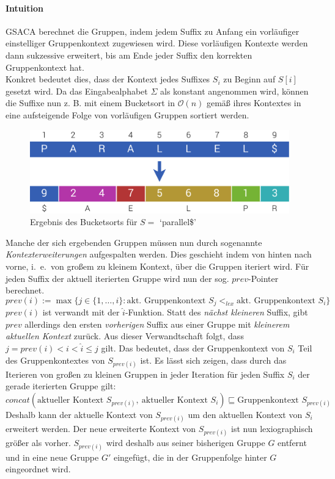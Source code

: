 \documentclass[twoside,a4paper,11pt]{article}
\theoremstyle{break}
\begin{document}
\paragraph{Intuition} GSACA berechnet die Gruppen, indem jedem Suffix zu Anfang ein vorläufiger einstelliger Gruppenkontext zugewiesen wird. Diese vorläufigen Kontexte werden dann sukzessive erweitert, bis am Ende jeder Suffix den korrekten Gruppenkontext hat.\\

Konkret bedeutet dies, dass der Kontext jedes Suffixes $S_i$ zu Beginn auf $S[i]$ gesetzt wird. Da das Eingabealphabet $\Sigma$ als konstant angenommen wird, können die Suffixe nun z. B. mit einem Bucketsort in $\mathcal{O}(n)$ gemäß ihres Kontextes in eine aufsteigende Folge von vorläufigen Gruppen sortiert werden.

\begin{figure}[h]
	\centering
	\includegraphics[width=0.5\linewidth,bb=0 0 640 207]{./assets/bucketsort.pdf}
	\caption{Ergebnis des Bucketsorts für $S =$ `parallel\$'}
\label{fig:bucketsort}
\end{figure}

Manche der sich ergebenden Gruppen müssen nun durch sogenannte \textit{Kontexterweiterungen} aufgespalten werden. Dies geschieht indem von hinten nach vorne, i.~e.\ von großem zu kleinem Kontext, über die Gruppen iteriert wird. Für jeden Suffix der aktuell iterierten Gruppe wird nun der sog. $prev$-Pointer berechnet.
$$prev(i) := \max \{ j \in \{ 1, \dots, i \}: \text{akt. Gruppenkontext } S_j <_{lex} \text{akt. Gruppenkontext } S_i \}$$
$prev(i)$ ist verwandt mit der $\widehat{i}$-Funktion. Statt des \textit{nächst kleineren} Suffix, gibt $prev$ allerdings den ersten \textit{vorherigen} Suffix aus einer Gruppe mit \textit{kleinerem aktuellen Kontext} zurück. Aus dieser Verwandtschaft folgt, dass $j = prev(i) < i < \widehat{i} \le \widehat{j}$ gilt. Das bedeutet, dass der Gruppenkontext von $S_i$ Teil des Gruppenkontextes von $S_{prev(i)}$ ist. Es lässt sich zeigen, dass durch das Iterieren von großen zu kleinen Gruppen in jeder Iteration für jeden Suffix $S_i$ der gerade iterierten Gruppe gilt:
$$concat(\text{aktueller Kontext } S_{prev(i)},\ \text{aktueller Kontext } S_i) \sqsubseteq \text{Gruppenkontext } S_{prev(i)}$$
Deshalb kann der aktuelle Kontext von $S_{prev(i)}$ um den aktuellen Kontext von $S_i$ erweitert werden. Der neue erweiterte Kontext von $S_{prev(i)}$ ist nun lexiographisch größer als vorher. $S_{prev(i)}$ wird deshalb aus seiner bisherigen Gruppe $G$ entfernt und in eine neue Gruppe $G'$ eingefügt, die in der Gruppenfolge hinter $G$ eingeordnet wird.
\end{document}
